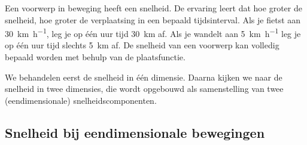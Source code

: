 \documentclass{ximera}
\begin{document}
	\author{Bart Lambregs,Vincent Gellens}
    \xmsource\xmuitleg





Een voorwerp in beweging heeft een snelheid. 
De ervaring leert dat hoe groter de snelheid, hoe groter de verplaatsing in een bepaald tijdsinterval. 
Als je fietst aan \SI{30}{\kilo\meter\per\hour}, leg je op één uur tijd \SI{30}{km} af. 
Als je wandelt aan \SI{5}{\kilo\meter\per\hour} leg je op één uur tijd slechts \SI{5}{km} af. 
De snelheid van een voorwerp kan volledig bepaald worden met behulp van de plaatsfunctie. 

We behandelen eerst de snelheid in één dimensie. 
Daarna kijken we naar de snelheid in twee dimensies, die wordt opgebouwd als samenstelling van twee (eendimensionale) snelheidscomponenten. 





\subsection*{Snelheid bij eendimensionale bewegingen}
\end{document}
